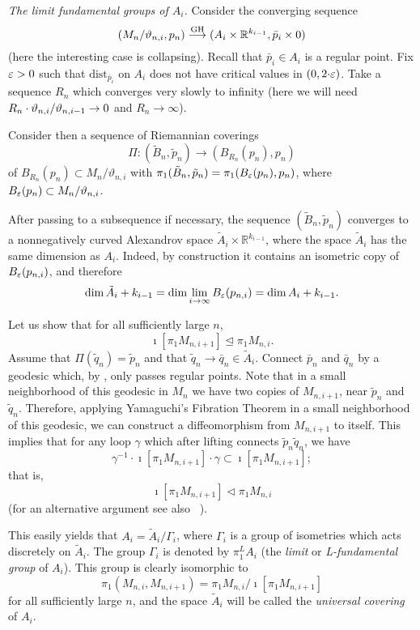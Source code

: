 \documentclass{amsart}
\begin{document}
{\it The limit fundamental groups of $A_i$.} 
Consider the converging sequence
\[(M_{n}/\vartheta_{n,i},p_{n})\GHto (A_i\times \mathbb{R}^{k_{i-1}},\bar p_i\times 0)\]
(here the interesting case is collapsing).
Recall that
$\bar p_i\in A_i$
is a regular point.
Fix $\varepsilon>0$ such that
$\text{dist}_{\bar p_i}$ on $A_i$
does not have critical values in $(0,2{\cdot} \varepsilon)$.
Take a sequence $R_n$ which converges very slowly to infinity
(here we will need $R_n\z\cdot \vartheta_{n,i}/\vartheta_{n,i-1}\to 0$ and $R_n\to \infty$).

Consider then
a sequence of Riemannian coverings
$$\Pi\colon (\tilde B_n,\tilde p_n)\to (B_{R_n}(p_n), p_n)$$
of
$B_{R_n}(p_n)\subset {M}_n/\vartheta_{n,i}$ with
$\pi_1(\tilde B_n,\tilde p_n)=\pi_1(B_\varepsilon(p_{n}), p_n)$,
where $B_\varepsilon(p_{n})\subset M_n/\vartheta_{n,i}$.

After passing to a subsequence if necessary,
the sequence $(\tilde B_n,\tilde p_n)$
converges to a nonnegatively curved Alexandrov space
$\tilde A_i\times \mathbb{R}^{k_{i-1}}$,
where the space $\tilde A_i$ has the same dimension as $A_i$.
Indeed, by construction it  contains an isometric copy of
$B_\varepsilon(p_{n,i})$, and therefore
$$\dim \tilde A_i +k_{i-1}=
\dim \lim_{i\to\infty} B_\varepsilon(p_{n,i})=\dim A_i+k_{i-1}.$$

Let us show that for all sufficiently large $n$,
$$\imath[\pi_1M_{n,i+1}]\trianglelefteq\pi_1M_{n,i}.$$
Assume that $\Pi(\tilde q_n)=\tilde p_n$
and that $\tilde q_n\to \bar q_n\in \tilde A_i$.
Connect $\bar p_n$ and $\bar q_n$ by a geodesic
which, by \cite{Ptr3}, only passes regular points.
Note that in a small neighborhood  of this geodesic in $M_n$
 we have two copies of $M_{n,i+1}$, near $\tilde p_n$ and $\tilde q_n$.
Therefore,
applying Yamaguchi's  Fibration Theorem
in a small neighborhood  of this geodesic,
we can construct a diffeomorphism from $M_{n,i+1}$ to itself.
This  implies that for any loop $\gamma$ which after lifting
connects $\tilde p_n \tilde q_n$,
we have 
$$\gamma^{-1}{\cdot} \imath[\pi_1M_{n,i+1}]{\cdot}
\gamma\subset \imath[\pi_1M_{n,i+1}];$$  
that is,
$$\imath[\pi_1M_{n,i+1}]\lhd\pi_1M_{n,i}$$
(for an alternative argument see also ~\cite{FY}).


This easily yields that $A_i=\tilde A_i/\Gamma_i$,
where $\Gamma_i$ is a group of isometries
which acts %
discretely on $\tilde A_i$.
The group $\Gamma_i$ is denoted  by $\pi_1^LA_i$
(the \emph{limit} or \emph{L-fundamental group} of $A_i$).
This group  is clearly isomorphic to
$$\pi_1(M_{n,i},M_{n,i+1})=\pi_1M_{n,i}/\imath[ \pi_1M_{n,i+1}]$$
for all sufficiently large $n$, and
the space $\tilde A_i$ will be called the \emph{universal covering} of $A_i$.
\end{document}
